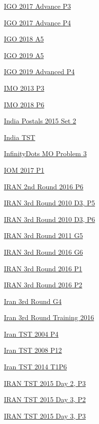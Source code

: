 \hyperref  [problem:IGO 2017 Advance P3]{IGO 2017 Advance P3}

\hyperref  [problem:IGO 2017 Advance P4]{IGO 2017 Advance P4}

\hyperref  [problem:IGO 2018 A5]{IGO 2018 A5}

\hyperref  [problem:IGO 2019 A5]{IGO 2019 A5}

\hyperref  [problem:IGO 2019 Advanced P4]{IGO 2019 Advanced P4}

\hyperref  [problem:IMO 2013 P3]{IMO 2013 P3}

\hyperref  [problem:IMO 2018 P6]{IMO 2018 P6}

\hyperref  [problem:India Postals 2015 Set 2]{India Postals 2015 Set 2}

\hyperref  [problem:India TST]{India TST}

\hyperref  [problem:InfinityDots MO Problem 3]{InfinityDots MO Problem 3}

\hyperref  [problem:IOM 2017 P1]{IOM 2017 P1}

\hyperref  [problem:IRAN 2nd Round 2016 P6]{IRAN 2nd Round 2016 P6}

\hyperref  [problem:IRAN 3rd Round 2010 D3, P5]{IRAN 3rd Round 2010 D3, P5}

\hyperref  [problem:IRAN 3rd Round 2010 D3, P6]{IRAN 3rd Round 2010 D3, P6}

\hyperref  [problem:IRAN 3rd Round 2011 G5]{IRAN 3rd Round 2011 G5}

\hyperref  [problem:IRAN 3rd Round 2016 G6]{IRAN 3rd Round 2016 G6}

\hyperref  [problem:IRAN 3rd Round 2016 P1]{IRAN 3rd Round 2016 P1}

\hyperref  [problem:IRAN 3rd Round 2016 P2]{IRAN 3rd Round 2016 P2}

\hyperref  [problem:Iran 3rd Round G4]{Iran 3rd Round G4}

\hyperref  [problem:Iran 3rd Round Training 2016]{Iran 3rd Round Training 2016}

\hyperref  [problem:Iran TST 2004 P4]{Iran TST 2004 P4}

\hyperref  [problem:Iran TST 2008 P12]{Iran TST 2008 P12}

\hyperref  [problem:Iran TST 2014 T1P6]{Iran TST 2014 T1P6}

\hyperref  [problem:IRAN TST 2015 Day 2, P3]{IRAN TST 2015 Day 2, P3}

\hyperref  [problem:IRAN TST 2015 Day 3, P2]{IRAN TST 2015 Day 3, P2}

\hyperref  [problem:IRAN TST 2015 Day 3, P3]{IRAN TST 2015 Day 3, P3}

